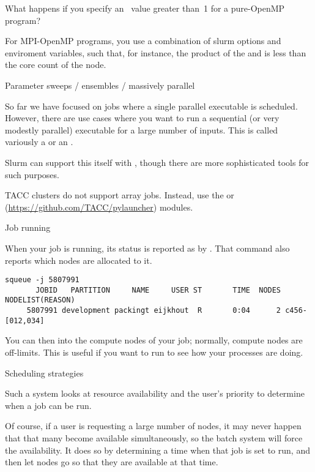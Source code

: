 \begin{exercise}
  What happens if you specify an~ value greater than~1
  for a pure-OpenMP program?
\end{exercise}

For  MPI-OpenMP programs, you use a combination
of slurm options and enviroment variables, such that, for instance,
the product of the  and  is less than the
core count of the node.

 {Parameter sweeps / ensembles / massively parallel}
\label{sec:slurm-sweep}

So far we have focused on jobs where a single parallel executable is scheduled.
However, there are use cases where you want to run a sequential (or very modestly parallel)
executable for a large number of inputs.
This is called variously a  or an .

Slurm can support this itself with ,
though there are more sophisticated  tools
for such purposes.

\begin{taccnote}
  TACC clusters do not support array jobs.
  Instead, use the  or 
  (\url{https://github.com/TACC/pylauncher}) modules.
\end{taccnote}

 {Job running}

When your job is running, its status is reported as  by .
That command also reports which nodes are allocated to it.

\begin{verbatim}
squeue -j 5807991
       JOBID   PARTITION     NAME     USER ST       TIME  NODES NODELIST(REASON)
     5807991 development packingt eijkhout  R       0:04      2 c456-[012,034]
\end{verbatim}

You can then  into the compute nodes of your job; 
normally, compute nodes are off-limits.
This is useful if you want to run 
to see how your processes are doing.

 {Scheduling strategies}
\label{sec:slurm-schedule}

Such a system looks at resource availability
and the user's priority to determine when a job can be run.

Of course, if a user is requesting a large number of nodes,
it may never happen that that many become available simultaneously,
so the batch system will force the availability.
It does so by determining a time when that job is
set to run, and then let nodes go 
so that they are available at that time.

